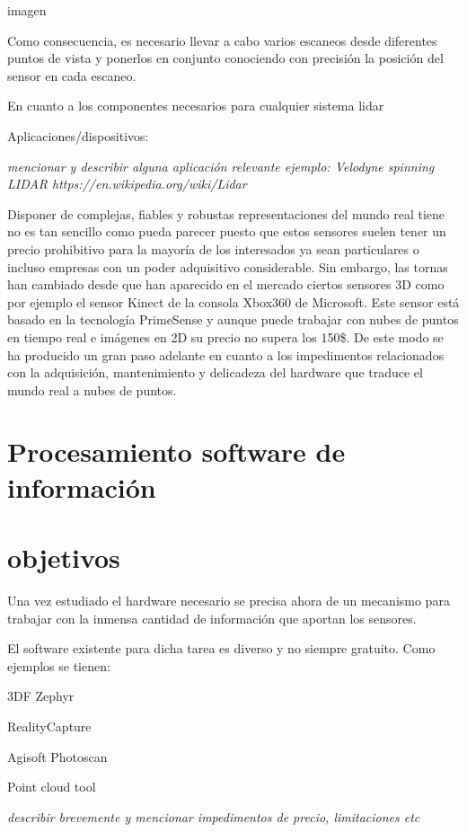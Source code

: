 imagen 


Como consecuencia, es necesario llevar a cabo varios escaneos desde diferentes puntos de vista y
ponerlos en conjunto conociendo con precisión la posición del sensor en cada escaneo.




En cuanto a los componentes necesarios para cualquier sistema lidar 

Aplicaciones/dispositivos:

\textit{mencionar y describir alguna aplicación relevante ejemplo: Velodyne spinning LIDAR https://en.wikipedia.org/wiki/Lidar}





Disponer de complejas, fiables y robustas representaciones del mundo real tiene no es tan sencillo como pueda parecer puesto que estos sensores suelen tener un precio prohibitivo para la mayoría de los interesados ya sean particulares o incluso empresas con un poder adquisitivo considerable. Sin embargo, las tornas han cambiado desde que han aparecido en el mercado ciertos sensores 3D como por ejemplo el sensor Kinect de la consola Xbox360 de Microsoft. Este sensor está basado en la tecnología PrimeSense y aunque puede trabajar con nubes de puntos en tiempo real e imágenes en 2D su precio no supera los 150\$. De este modo se ha producido un gran paso adelante en cuanto a los impedimentos relacionados con la adquisición, mantenimiento y delicadeza del hardware que traduce el mundo real a nubes de puntos.

\section{Procesamiento software de información }
\section{objetivos}
Una vez estudiado el hardware necesario se precisa ahora de un mecanismo para trabajar con la inmensa cantidad de información que aportan los sensores. 

El software existente para dicha tarea es diverso y no siempre gratuito. Como ejemplos se tienen:
\begin{list}{-}
\item 3DF Zephyr
\item RealityCapture
\item Agisoft Photoscan
\item Point cloud tool

\textit{describir brevemente y mencionar impedimentos de precio, limitaciones etc
}
\end{list}




